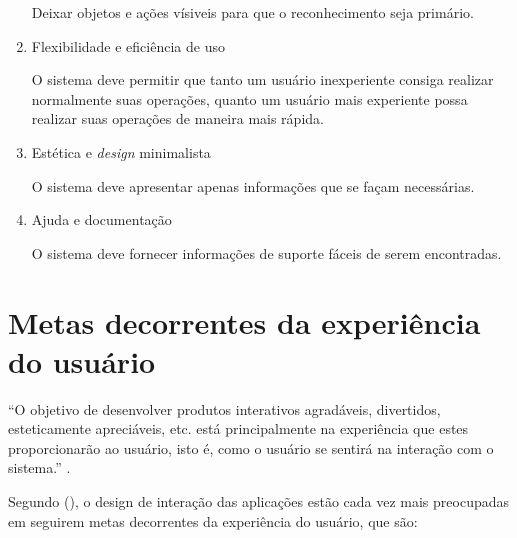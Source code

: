 \begin{enumerate}
	\subitem Deixar objetos e ações vísiveis para que o reconhecimento seja primário.
	
     \item Flexibilidade e eficiência de uso
	
	\subitem O sistema deve permitir que tanto um usuário inexperiente consiga realizar normalmente suas operações,
	quanto um usuário mais experiente possa realizar suas operações de maneira mais rápida.
	
     \item Estética e \textit{design} minimalista
	
	\subitem O sistema deve apresentar apenas informações que se façam necessárias.
	
     \item Ajuda e documentação
     
	\subitem O sistema deve fornecer informações de suporte fáceis de serem encontradas.
      
    \end{enumerate}
      
  \section{Metas decorrentes da experiência do usuário}
    
    “O objetivo de desenvolver produtos interativos agradáveis, divertidos, esteticamente apreciáveis, etc. 
    está principalmente na experiência que estes proporcionarão ao usuário, isto é, como o usuário se 
    sentirá na interação com o sistema.” \cite{preece}.
    
    Segundo \citeauthor{preece} (\citeyear{preece}), o design de interação das aplicações estão cada vez mais preocupadas em seguirem 
    metas decorrentes da experiência do usuário, que são:
    
